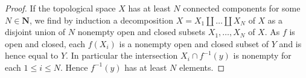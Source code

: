 \documentclass[10pt,a4paper]{amsart}
\theoremstyle{plain}
\theoremstyle{definition}
\theoremstyle{remark}
\numberwithin{equation}{subsection}
\begin{document}
\begin{proof}
If the topological space $X$ has at least $N$ connected components for some
$N \in \mathbf{N}$, we find by induction a decomposition
$X = X_1 \amalg \ldots \amalg X_N$ of $X$ as a disjoint union of $N$ nonempty
open and closed subsets $X_1, \ldots , X_N$ of $X$. As $f$ is open and closed,
each $f(X_i)$ is a nonempty open and closed subset of $Y$ and is hence equal to
$Y$. In particular the intersection $X_i \cap f^{-1}(y)$ is nonempty for each
$1 \leq i \leq N$. Hence $f^{-1}(y)$ has at least $N$ elements.
\end{proof}
\end{document}
